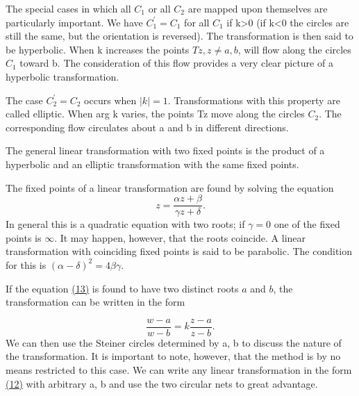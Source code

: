 The special cases in which all $C_{1}$ or all $C_{2}$ are mapped upon themselves are particularly important. We have $C_{1}^{\prime}=C_{1}$ for all $C_{1}$ if k>0 (if k<0 the circles are still the same, but the orientation is reversed). The transformation is then said to be hyperbolic. When k increases the points $Tz, z\neq a, b$, will flow along the circles $C_{1}$ toward b. The consideration of this flow provides a very clear picture of a hyperbolic transformation.

The case $C_{2}^{\prime}=C_{2}$ occurs when $|k|=1$. Transformations with this property are called elliptic. When arg k varies, the points Tz move along the circles $C_{2}$. The corresponding flow circulates about a and b in different directions.

The general linear transformation with two fixed points is the product of a hyperbolic and an elliptic transformation with the same fixed points.

The fixed points of a linear transformation are found by solving the equation
\begin{equation*}
z = \frac {\alpha z + \beta}{\gamma z + \delta}.\tag{13}\label{eq:3.13}
\end{equation*}
In general this is a quadratic equation with two roots; if $\gamma = 0$ one of the fixed points is $\infty$. It may happen, however, that the roots coincide. A linear transformation with coinciding fixed points is said to be parabolic. The condition for this is $(\alpha - \delta)^{2} = 4\beta\gamma$.

If the equation \hyperref[eq:3.13]{(13)} is found to have two distinct roots $a$ and $b$, the transformation can be written in the form


\begin{equation*}
{\frac {w - a}{w - b}} = k {\frac {z - a}{z - b}}.
\end{equation*}
We can then use the Steiner circles determined by a, b to discuss the nature of the transformation. It is important to note, however, that the method is by no means restricted to this case. We can write any linear transformation in the form \hyperref[eq:3.12]{(12)} with arbitrary a, b and use the two circular nets to great advantage.

